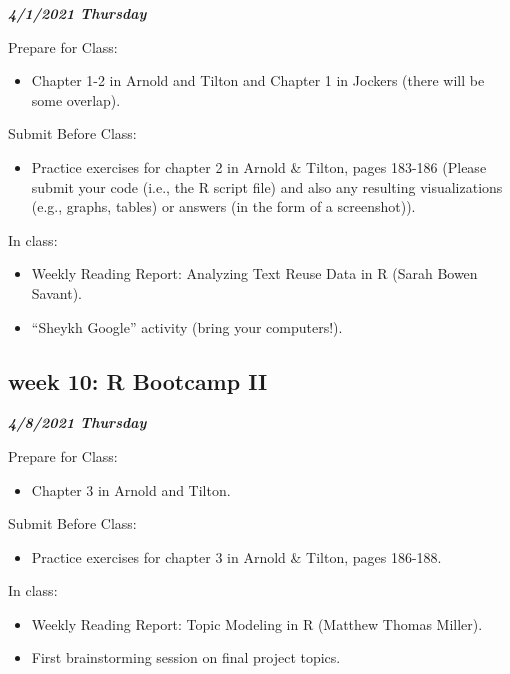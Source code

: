 \documentclass[
]{book}
\providecommand{\tightlist}{%
  \setlength{\itemsep}{0pt}\setlength{\parskip}{0pt}}
\begin{document}
\textbf{\emph{4/1/2021 Thursday}}

Prepare for Class:

\begin{itemize}
\tightlist
\item
  Chapter 1-2 in Arnold and Tilton and Chapter 1 in Jockers (there will be some overlap).
\end{itemize}

Submit Before Class:

\begin{itemize}
\tightlist
\item
  Practice exercises for chapter 2 in Arnold \& Tilton, pages 183-186 (Please submit your code (i.e., the R script file) and also any resulting visualizations (e.g., graphs, tables) or answers (in the form of a screenshot)).
\end{itemize}

In class:

\begin{itemize}
\tightlist
\item
  Weekly Reading Report: Analyzing Text Reuse Data in R (Sarah Bowen Savant).
\item
  ``Sheykh Google'' activity (bring your computers!).
\end{itemize}

\hypertarget{week-10-r-bootcamp-ii}{%
\subsection{week 10: R Bootcamp II}\label{week-10-r-bootcamp-ii}}

\textbf{\emph{4/8/2021 Thursday}}

Prepare for Class:

\begin{itemize}
\tightlist
\item
  Chapter 3 in Arnold and Tilton.
\end{itemize}

Submit Before Class:

\begin{itemize}
\tightlist
\item
  Practice exercises for chapter 3 in Arnold \& Tilton, pages 186-188.
\end{itemize}

In class:

\begin{itemize}
\tightlist
\item
  Weekly Reading Report: Topic Modeling in R (Matthew Thomas Miller).
\item
  First brainstorming session on final project topics.
\end{itemize}
\end{document}
